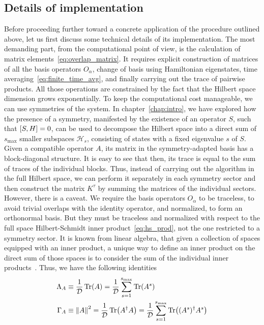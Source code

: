 \subsection{Details of implementation}
Before proceeding further toward a concrete application of the procedure outlined above, let us first discuss
 some technical details of its implementation. The most demanding part, from the computational point of view,
 is the calculation of matrix elements~\eqref{eq:overlap_matrix}. It requires explicit construction of
 matrices of all the basis operators \(O_{\alpha}\), change of basis using Hamiltonian eigenstates,
 time averaging~\eqref{eq:finite_time_avg}, and finally carrying out the trace of pairwise products.
 All those operations are constrained by the fact that the Hilbert space dimension grows exponentially.
 To keep the computational cost manageable, we can use symmetries of the system. In chapter~\ref{chap:intro}, we
 have explored how the presence of a symmetry, manifested by the existence of an operator \(S\), such
 that \(\comm{S}{H} = 0\), can be used to decompose the Hilbert space into a direct sum of \(s_{\text{max}}\) smaller
  subspaces \(\mathcal{H}_{s}\), consisting of states with a fixed eigenvalue \(s\) of \(S\). Given a
  compatible operator \(A\), its matrix in the symmetry-adapted basis has a block-diagonal structure.
  It is easy to see that then, its trace is equal to the sum of traces of the individual blocks.
  Thus, instead of carrying out the algorithm in the full Hilbert space, we can perform it separately
  in each symmetry sector and then construct the matrix \(K^{\tau}\) by summing the matrices of the
  individual sectors. However, there is a caveat. We require the basis operators \(O_{\alpha}\) to be
  traceless, to avoid trivial overlaps with the identity operator, and normalized, to form an orthonormal
  basis. But they must be traceless and normalized with respect to the full space Hilbert-Schmidt inner
  product~\eqref{eq:hs_prod}, not the one restricted to a symmetry sector. It is known from linear algebra,
  that given a collection of spaces equipped with an inner product, a unique way to define an inner product
  on the direct sum of those spaces is to consider the sum of the individual inner products~\autocite{Conway2007}.
  Thus, we have the following identities
  \begin{align}
    \Lambda_A &\equiv \frac{1}{\mathcal{D}} \Tr(A) = \frac{1}{\mathcal{D}} \sum_{s=1}^{s_{\text{max}}} \Tr(A^s)\\
    \Gamma_A &\equiv \norm{A}^2 = \frac{1}{\mathcal{D}} \Tr(A^{\dag}A) = \frac{1}{\mathcal{D}} \sum_{s=1}^{s_{\text{max}}} \Tr((A^s)^{\dag}A^s)
  \end{align}
